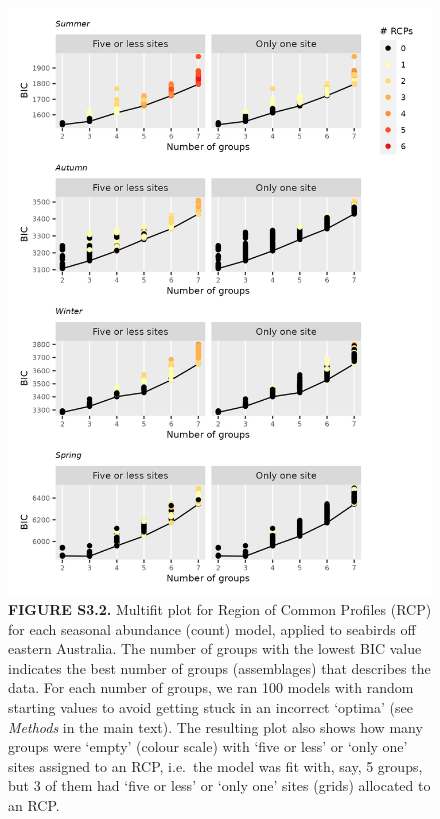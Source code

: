 \documentclass[
]{article}
\begin{document}
\begin{figure}
\centering
\includegraphics{../results/FigS3_2_multifit-NegBin.png}
\caption{\textbf{FIGURE S3.2.} Multifit plot for Region of Common
Profiles (RCP) for each seasonal abundance (count) model, applied to
seabirds off eastern Australia. The number of groups with the lowest BIC
value indicates the best number of groups (assemblages) that describes
the data. For each number of groups, we ran 100 models with random
starting values to avoid getting stuck in an incorrect `optima' (see
\emph{Methods} in the main text). The resulting plot also shows how many
groups were `empty' (colour scale) with `five or less' or `only one'
sites assigned to an RCP, i.e.~the model was fit with, say, 5 groups,
but 3 of them had `five or less' or `only one' sites (grids) allocated
to an RCP.}
\end{figure}

\newpage
\end{document}
